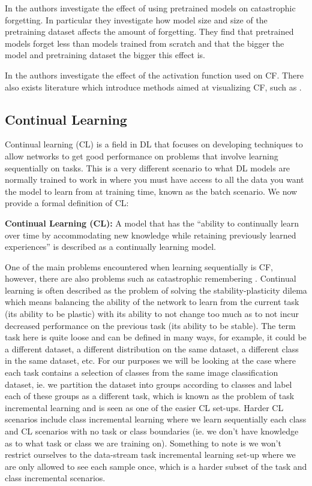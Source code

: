 In \cite{ramasesh2022effect} the authors investigate the effect of using pretrained models on catastrophic forgetting. In particular they investigate how model size and size of the pretraining dataset affects the amount of forgetting. They find that pretrained models forget less than models trained from scratch and that the bigger the model and pretraining dataset the bigger this effect is. 

In \cite{goodfellow2013empirical} the authors investigate the effect of the activation function used on CF. There also exists literature which introduce methods aimed at visualizing CF, such as \cite{gigante2019visualizing,nguyen2020dissecting}.

\subsection{Continual Learning}
\label{subsec:CL}
Continual learning (CL) \cite{parisi2019continual} is a field in DL that focuses on developing techniques to allow networks to get good performance on problems that involve learning sequentially on tasks. This is a very different scenario to what DL models are normally trained to work in where you must have access to all the data you want the model to learn from at training time, known as the batch scenario. We now provide a formal definition of CL:
\begin{definition}
    \textbf{Continual Learning (CL):} A model that has the ``ability to continually learn over time by accommodating new knowledge while retaining previously learned experiences''\cite{parisi2019continual} is described as a continually learning model. 
\end{definition}
One of the main problems encountered when learning sequentially is CF, however, there are also problems such as catastrophic remembering \cite{sharkey1995analysis}. Continual learning is often described as the problem of solving the stability-plasticity dilema which means balancing the ability of the network to learn from the current task (its ability to be plastic) with its ability to not change too much as to not incur decreased performance on the previous task (its ability to be stable). The term task here is quite loose and can be defined in many ways, for example, it could be a different dataset, a different distribution on the same dataset, a different class in the same dataset, etc. For our purposes we will be looking at the case where each task contains a selection of classes from the same image classification dataset, ie. we partition the dataset into groups according to classes and label each of these groups as a different task, which is known as the problem of task incremental learning and is seen as one of the easier CL set-ups. Harder CL scenarios include class incremental learning where we learn sequentially each class and CL scenarios with no task or class boundaries (ie. we don't have knowledge as to what task or class we are training on). Something to note is we won't restrict ourselves to the data-stream task incremental learning set-up where we are only allowed to see each sample once, which is a harder subset of the task and class incremental scenarios. 

